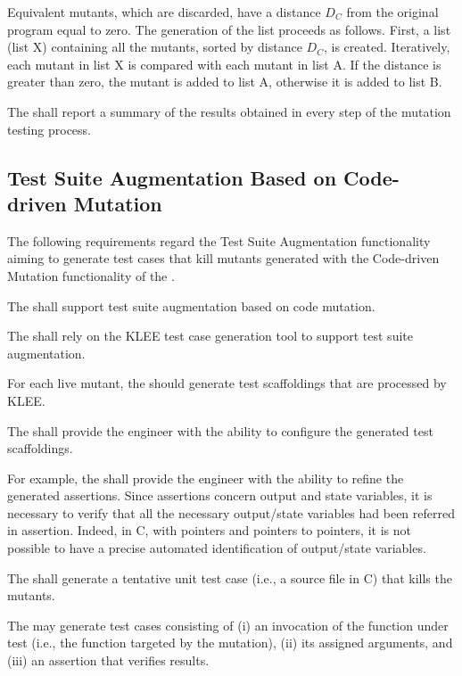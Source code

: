 \remark Equivalent mutants, which are discarded, have a distance $D_C$ from the original program equal to zero.
The generation of the list proceeds as follows. First, a list (list X) containing all the mutants, sorted by distance $D_C$, is created. Iteratively, each mutant in list X is compared with each mutant in list A. If the distance is greater than zero, the mutant is added to list A, otherwise it is added to list B.


\RQ{} The \FAQAS shall report a summary of the results obtained in every step of the mutation testing process.



\subsection{Test Suite Augmentation Based on Code-driven Mutation}
\label{sec:codeDrivenAugmentation}

The following requirements regard the Test Suite Augmentation functionality aiming to generate test cases that kill mutants generated with the Code-driven Mutation functionality of the \FAQAS.

\RQ{} The \FAQAS shall support test suite augmentation based on code mutation.

\RQ{} The \FAQAS shall rely on the KLEE test case generation tool to support test suite augmentation.

\RQ{} For each live mutant, the \FAQAS should generate test scaffoldings that are processed by KLEE.

\RQ{} The \FAQAS shall provide the engineer with the ability to configure the generated test scaffoldings.


\remark For example, the \FAQAS shall provide the engineer with the ability to refine the generated assertions. Since assertions concern output and state variables, it is necessary to verify that all the necessary output/state variables had been referred in assertion. Indeed, in C, with pointers and pointers to pointers, it is not possible to have a precise automated identification of output/state variables.

\RQ{} The \FAQAS shall generate a tentative unit test case (i.e., a source file in C) that kills the mutants.

\remark  The \FAQAS may generate test cases consisting of (i) an invocation of the function under test (i.e., the function targeted by the mutation), (ii) its assigned arguments, and (iii) an assertion that verifies results.

